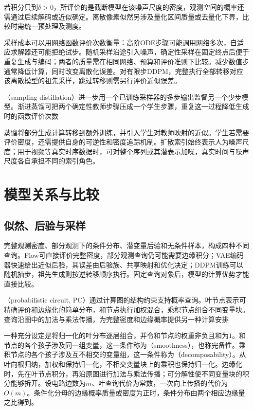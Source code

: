 若积分只到$\delta>0$，所评价的是截断模型在该噪声尺度的密度，观测空间的概率还需通过后续解码或近似确定。离散像素似然另涉及量化区间质量或去量化下界，比较时需统一预处理及测度。

采样成本可以用网络函数评价次数衡量：高阶ODE步骤可能调用网络多次，自适应求解器还可能拒绝试步。随机采样沿途引入噪声，确定性采样在固定终点后便于重复生成与编码；两者的质量需在相同网络、预算和评价准则下比较。减少数值步通常降低计算，同时改变离散化误差。对有限步DDPM，完整执行全部转移对应该离散模型的祖先采样，跳过转移则需另行评价近似误差。

（sampling distillation）进一步用一个已训练采样器的多步输出监督另一个少步模型。渐进蒸馏可把两个确定性教师步骤压成一个学生步骤，重复这一过程降低生成时的函数评价次数

蒸馏将部分生成计算转移到额外训练，并引入学生对教师映射的近似。学生若需要评价密度，还需提供自身的可逆性和密度追踪机制。扩散索引始终表示人为噪声尺度；用于视频等真实时序数据时，可对整个序列或其潜表示加噪，真实时间与噪声尺度各自承担不同的索引角色。

\section{模型关系与比较}
\label{sec:pgm-generative-comparison}

\subsection{似然、后验与采样}
\label{sec:pgm-generative-likelihood-posterior-sampling}

完整观测密度、部分观测下的条件分布、潜变量后验和无条件样本，构成四种不同查询。Flow可直接评价完整密度，部分观测查询仍可能需要边缘积分；VAE编码器快速给出近似后验，其误差由后验族、共享映射和优化决定；DDPM训练可以随机抽步，祖先生成则按逆转移顺序执行。固定查询对象后，模型的计算优势才能直接比较。

（probabilistic circuit, PC）通过计算图的结构约束支持概率查询。叶节点表示可精确评价和边缘化的简单分布，和节点执行加权混合，乘积节点组合不同变量块。查询沿图中的加法与乘法传播，为完整密度和边缘概率提供另一种计算安排

一种充分设定是将归一化的叶分布逐层组合，并令和节点的权重非负且和为$1$。和节点的各个孩子涉及同一组变量，这一条件称为（smoothness），也称完备性。乘积节点的各个孩子涉及互不相交的变量组，这一条件称为（decomposability）。从叶向根归纳，加权和保持归一化，不相交变量块上的乘积也保持归一化。边缘化时，先在叶节点积分，再沿原图进行加法与乘法传播；可分解性使不同变量块的积分能够拆开。设电路边数为$m$、叶查询代价为常数，一次向上传播的代价为$O(m)$。条件化分母的边缘概率质量或密度为正时，条件分布由两个相应边缘量之比得到。

